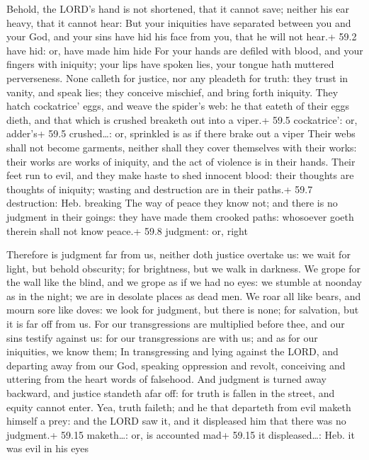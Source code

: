  Behold, the LORD's hand is not shortened, that it cannot
save; neither his ear heavy, that it cannot hear:  But your
iniquities have separated between you and your God, and your sins have
hid his face from you, that he will not hear.+ 59.2 have hid: or, have
made him hide  For your hands are defiled with blood, and
your fingers with iniquity; your lips have spoken lies, your tongue hath
muttered perverseness.  None calleth for justice, nor any
pleadeth for truth: they trust in vanity, and speak lies; they conceive
mischief, and bring forth iniquity.  They hatch cockatrice'
eggs, and weave the spider's web: he that eateth of their eggs dieth,
and that which is crushed breaketh out into a viper.+ 59.5 cockatrice':
or, adder's+ 59.5 crushed\ldots: or, sprinkled is as if there brake out
a viper  Their webs shall not become garments, neither shall
they cover themselves with their works: their works are works of
iniquity, and the act of violence is in their hands.  Their
feet run to evil, and they make haste to shed innocent blood: their
thoughts are thoughts of iniquity; wasting and destruction are in their
paths.+ 59.7 destruction: Heb. breaking  The way of peace
they know not; and there is no judgment in their goings: they have made
them crooked paths: whosoever goeth therein shall not know peace.+ 59.8
judgment: or, right

 Therefore is judgment far from us, neither doth justice
overtake us: we wait for light, but behold obscurity; for brightness,
but we walk in darkness.  We grope for the wall like the
blind, and we grope as if we had no eyes: we stumble at noonday as in
the night; we are in desolate places as dead men.  We roar
all like bears, and mourn sore like doves: we look for judgment, but
there is none; for salvation, but it is far off from us. 
For our transgressions are multiplied before thee, and our sins testify
against us: for our transgressions are with us; and as for our
iniquities, we know them;  In transgressing and lying
against the LORD, and departing away from our God, speaking oppression
and revolt, conceiving and uttering from the heart words of falsehood.
 And judgment is turned away backward, and justice standeth
afar off: for truth is fallen in the street, and equity cannot enter.
 Yea, truth faileth; and he that departeth from evil maketh
himself a prey: and the LORD saw it, and it displeased him that there
was no judgment.+ 59.15 maketh\ldots: or, is accounted mad+ 59.15 it
displeased\ldots: Heb. it was evil in his eyes

